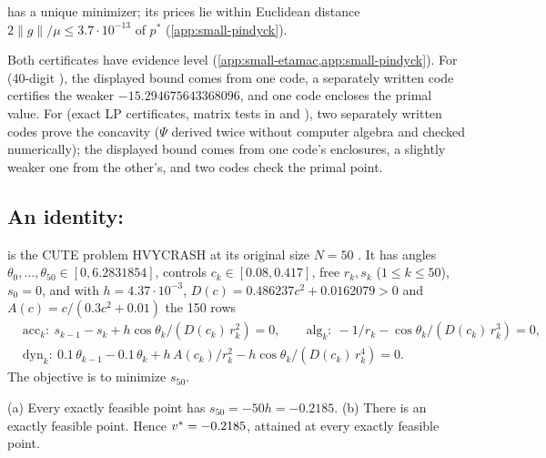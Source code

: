 \begin{corollary}\label{cor:pindyck-unique}
 has a unique minimizer; its prices lie within Euclidean distance $2\|g\|/\mu\le3.7\cdot10^{-13}$ of $p^*$ (\cref{app:small-pindyck}).
\end{corollary}

Both certificates have evidence level  (\cref{app:small-etamac,app:small-pindyck}).
For  (40-digit ), the displayed bound comes from one code, a separately written code certifies the weaker $-15.294675643368096$, and one code encloses the primal value.
For  (exact LP certificates, matrix tests in  and ), two separately written codes prove the concavity ($\Psi$ derived twice without computer algebra and checked numerically); the displayed bound comes from one code's enclosures, a slightly weaker one from the other's, and two codes check the primal point.

\subsection{An identity: }\label{sec:other-hvycrash}

 is the CUTE problem HVYCRASH at its original size $N=50$ \citep{bongartz1995-cute-constrained-and-unconstrained-testing,toint2013-cute-hvycrash-source-sif-files}.
It has angles $\theta_0,\dots,\theta_{50}\in[0,6.2831854]$, controls $c_k\in[0.08,0.417]$, free $r_k,s_k$ ($1\le k\le50$), $s_0=0$, and with $h=4.37\cdot10^{-3}$, $D(c)=0.486237c^2+0.0162079>0$ and $A(c)=c/(0.3c^2+0.01)$ the 150 rows
\begin{align*}
&\text{acc}_k:\ s_{k-1}-s_k+h\cos\theta_k/(D(c_k)\,r_k^2)=0,\qquad
\text{alg}_k:\ -1/r_k-\cos\theta_k/(D(c_k)\,r_k^3)=0,\\
&\text{dyn}_k:\ 0.1\,\theta_{k-1}-0.1\,\theta_k+h\,A(c_k)/r_k^2-h\cos\theta_k/(D(c_k)\,r_k^4)=0 .
\end{align*}
The objective is to minimize $s_{50}$.

\begin{proposition}\label{prop:hvycrash-identity}
(a) Every exactly feasible point has $s_{50}=-50h=-0.2185$.
(b) There is an exactly feasible point.
Hence $v^{*}=-0.2185$, attained at every exactly feasible point.
\end{proposition}

